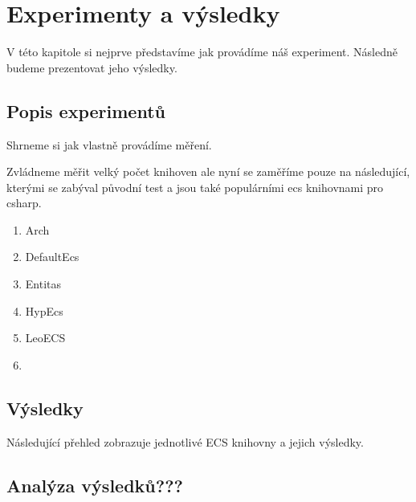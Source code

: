 \chapter{Experimenty a výsledky}
V této kapitole si nejprve představíme jak provádíme náš experiment. Následně budeme prezentovat jeho výsledky.

\section{Popis experimentů}
Shrneme si jak vlastně provádíme měření.

Zvládneme měřit velký počet knihoven ale nyní se zaměříme pouze na následující, kterými se zabýval původní test a jsou také populárními ecs knihovnami pro csharp.

\begin{enumerate}
    \item Arch~\cite{Arch}
    \item DefaultEcs~\cite{DefaultEcs}
    \item Entitas~\cite{Entitas}
    \item HypEcs~\cite{HypEcs}
    \item LeoECS~\cite{LeoECS}
    \item {}
\end{enumerate}

\section{Výsledky}
Následující přehled zobrazuje jednotlivé ECS knihovny a jejich výsledky.


\section{Analýza výsledků???}


















